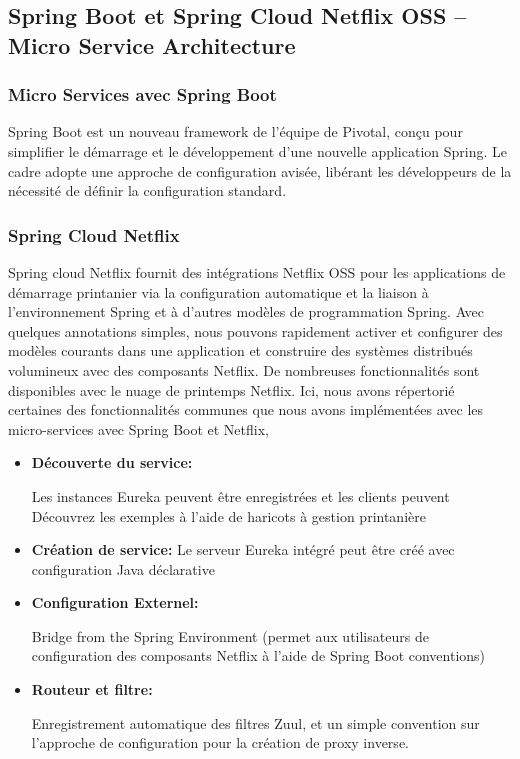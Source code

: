\subsection{Spring Boot et Spring Cloud Netflix OSS – Micro Service Architecture}

\subsubsection{Micro Services avec Spring Boot}

 

Spring Boot est un  nouveau framework de l'équipe de Pivotal, conçu pour simplifier le démarrage et le développement d'une nouvelle application Spring. Le cadre adopte une approche de configuration avisée, libérant les développeurs de la nécessité de définir la configuration standard.\parencite{MicroServices}

\subsubsection{Spring Cloud Netflix}
 

Spring cloud Netflix fournit des intégrations Netflix OSS pour les applications de démarrage printanier via la configuration automatique et la liaison à l'environnement Spring et à d'autres modèles de programmation Spring. Avec quelques annotations simples, nous pouvons rapidement activer et configurer des modèles courants dans une application et construire des systèmes distribués volumineux avec des composants Netflix. De nombreuses fonctionnalités sont disponibles avec le nuage de printemps Netflix. Ici, nous avons répertorié certaines des fonctionnalités communes que nous avons implémentées avec les micro-services avec Spring Boot et Netflix, \parencite{MicroServices}

\begin{itemize}
\item \textbf{Découverte du service:}
	
	Les instances Eureka peuvent être enregistrées et les clients peuvent
	Découvrez les exemples à l'aide de haricots à gestion printanière
	

\item \textbf{	Création de service:}	
	Le serveur Eureka intégré peut être créé avec
	configuration Java déclarative
	
\item \textbf{	Configuration Externel:}	
	
	Bridge from the Spring Environment (permet aux utilisateurs de
	configuration des composants Netflix à l'aide de Spring Boot
	conventions)
	
      \item \textbf{	Routeur et filtre:}	
	
	Enregistrement automatique des filtres Zuul, et un simple
	convention sur l'approche de configuration pour la création de proxy inverse.
\end{itemize}



